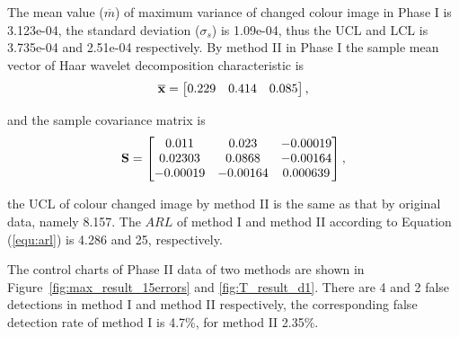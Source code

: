 The mean value ($\overline{m}$) of maximum variance of changed colour image in Phase I is 3.123e-04, the standard deviation ($\sigma_{s}$) is 1.09e-04, thus the UCL and LCL is 3.735e-04 and 2.51e-04 respectively. By method II in Phase I the sample mean vector of Haar wavelet decomposition characteristic is
\begin{equation}
\centering
\overline{\mathbf{x}} = 
\begin{bmatrix}
0.229&	0.414&	0.085
\end{bmatrix}, 
\end{equation}


and the sample covariance matrix is
\begin{equation}
\centering
\mathbf{S} = 
\begin{bmatrix}
0.011	&  0.023	&  -0.00019\\
0.02303	&  0.0868 &	-0.00164\\
-0.00019 &	-0.00164 &	0.000639
\end{bmatrix},
\end{equation}

the UCL of colour changed image by method II is the same as that by original data, namely 8.157. The $ARL$ of method I and method II according to Equation (\ref{equ:arl}) is 4.286 and 25, respectively. 

The control charts of Phase II data of two methods are shown in Figure~\ref{fig:max_result_15errors} and \ref{fig:T_result_d1}. There are 4 and 2 false detections in method I and method II respectively, the corresponding false detection rate of method I is 4.7\%, for method II 2.35\%.



